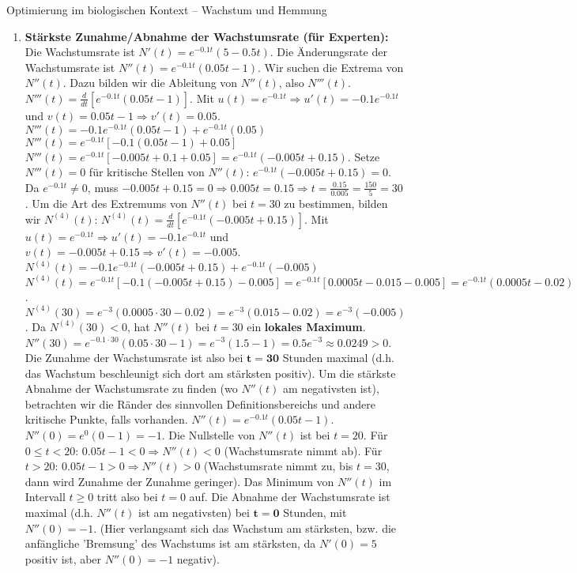 \begin{loesungsumgebung}{Optimierung im biologischen Kontext – Wachstum und Hemmung}
\begin{enumerate}[label=(\alph*)]
    \item \textbf{Stärkste Zunahme/Abnahme der Wachstumsrate (für Experten):}
    Die Wachstumsrate ist $N'(t) = e^{-0.1t}(5 - 0.5t)$. Die Änderungsrate der Wachstumsrate ist $N''(t) = e^{-0.1t}(0.05t - 1)$. Wir suchen die Extrema von $N''(t)$. Dazu bilden wir die Ableitung von $N''(t)$, also $N'''(t)$.
    $N'''(t) = \frac{d}{dt} [e^{-0.1t}(0.05t - 1)]$.
    Mit $u(t)=e^{-0.1t} \Rightarrow u'(t)=-0.1e^{-0.1t}$ und $v(t)=0.05t-1 \Rightarrow v'(t)=0.05$.
    $N'''(t) = -0.1e^{-0.1t}(0.05t - 1) + e^{-0.1t}(0.05)$
    $N'''(t) = e^{-0.1t}[-0.1(0.05t - 1) + 0.05]$
    $N'''(t) = e^{-0.1t}[-0.005t + 0.1 + 0.05] = e^{-0.1t}(-0.005t + 0.15)$.
    Setze $N'''(t)=0$ für kritische Stellen von $N''(t)$:
    $e^{-0.1t}(-0.005t + 0.15) = 0$.
    Da $e^{-0.1t} \neq 0$, muss $-0.005t + 0.15 = 0 \Rightarrow 0.005t = 0.15 \Rightarrow t = \frac{0.15}{0.005} = \frac{150}{5} = 30$.
    Um die Art des Extremums von $N''(t)$ bei $t=30$ zu bestimmen, bilden wir $N^{(4)}(t)$:
    $N^{(4)}(t) = \frac{d}{dt} [e^{-0.1t}(-0.005t + 0.15)]$.
    Mit $u(t)=e^{-0.1t} \Rightarrow u'(t)=-0.1e^{-0.1t}$ und $v(t)=-0.005t+0.15 \Rightarrow v'(t)=-0.005$.
    $N^{(4)}(t) = -0.1e^{-0.1t}(-0.005t + 0.15) + e^{-0.1t}(-0.005)$
    $N^{(4)}(t) = e^{-0.1t}[-0.1(-0.005t + 0.15) - 0.005] = e^{-0.1t}[0.0005t - 0.015 - 0.005] = e^{-0.1t}(0.0005t - 0.02)$.
    $N^{(4)}(30) = e^{-3}(0.0005 \cdot 30 - 0.02) = e^{-3}(0.015 - 0.02) = e^{-3}(-0.005)$.
    Da $N^{(4)}(30) < 0$, hat $N''(t)$ bei $t=30$ ein \textbf{lokales Maximum}.
    $N''(30) = e^{-0.1 \cdot 30}(0.05 \cdot 30 - 1) = e^{-3}(1.5 - 1) = 0.5e^{-3} \approx 0.0249 > 0$.
    Die Zunahme der Wachstumsrate ist also bei $\mathbf{t=30}$ Stunden maximal (d.h. das Wachstum beschleunigt sich dort am stärksten positiv).
    Um die stärkste Abnahme der Wachstumsrate zu finden (wo $N''(t)$ am negativsten ist), betrachten wir die Ränder des sinnvollen Definitionsbereichs und andere kritische Punkte, falls vorhanden. $N''(t) = e^{-0.1t}(0.05t - 1)$.
    $N''(0) = e^0(0-1) = -1$.
    Die Nullstelle von $N''(t)$ ist bei $t=20$.
    Für $0 \le t < 20$: $0.05t-1 < 0 \Rightarrow N''(t) < 0$ (Wachstumsrate nimmt ab).
    Für $t > 20$: $0.05t-1 > 0 \Rightarrow N''(t) > 0$ (Wachstumsrate nimmt zu, bis $t=30$, dann wird Zunahme der Zunahme geringer).
    Das Minimum von $N''(t)$ im Intervall $t \ge 0$ tritt also bei $t=0$ auf.
    Die Abnahme der Wachstumsrate ist maximal (d.h. $N''(t)$ ist am negativsten) bei $\mathbf{t=0}$ Stunden, mit $N''(0) = -1$. (Hier verlangsamt sich das Wachstum am stärksten, bzw. die anfängliche 'Bremsung' des Wachstums ist am stärksten, da $N'(0)=5$ positiv ist, aber $N''(0)=-1$ negativ).
\end{enumerate}

\end{loesungsumgebung}



